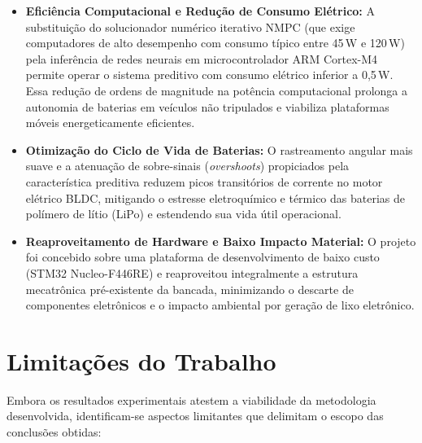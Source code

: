 \begin{itemize}
    \item \textbf{Eficiência Computacional e Redução de Consumo Elétrico:} A substituição do solucionador numérico iterativo NMPC (que exige computadores de alto desempenho com consumo típico entre 45\,W e 120\,W) pela inferência de redes neurais em microcontrolador ARM Cortex-M4 permite operar o sistema preditivo com consumo elétrico inferior a 0,5\,W. Essa redução de ordens de magnitude na potência computacional prolonga a autonomia de baterias em veículos não tripulados e viabiliza plataformas móveis energeticamente eficientes.
    \item \textbf{Otimização do Ciclo de Vida de Baterias:} O rastreamento angular mais suave e a atenuação de sobre-sinais (\textit{overshoots}) propiciados pela característica preditiva reduzem picos transitórios de corrente no motor elétrico BLDC, mitigando o estresse eletroquímico e térmico das baterias de polímero de lítio (LiPo) e estendendo sua vida útil operacional.
    \item \textbf{Reaproveitamento de Hardware e Baixo Impacto Material:} O projeto foi concebido sobre uma plataforma de desenvolvimento de baixo custo (STM32 Nucleo-F446RE) e reaproveitou integralmente a estrutura mecatrônica pré-existente da bancada, minimizando o descarte de componentes eletrônicos e o impacto ambiental por geração de lixo eletrônico.
\end{itemize}

\section{Limitações do Trabalho}
\label{sec:conclusao_limitacoes}

Embora os resultados experimentais atestem a viabilidade da metodologia desenvolvida, identificam-se aspectos limitantes que delimitam o escopo das conclusões obtidas:

